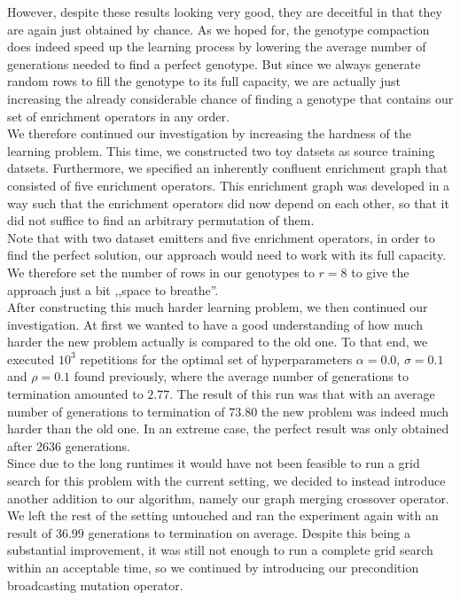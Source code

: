 However, despite these results looking very good, they are deceitful in that they are again just obtained by chance.
As we hoped for, the genotype compaction does indeed speed up the learning process by lowering the average number of generations needed to find a perfect genotype.
But since we always generate random rows to fill the genotype to its full capacity, we are actually just increasing the already considerable chance of finding a genotype that contains our set of enrichment operators in any order.\\

We therefore continued our investigation by increasing the hardness of the learning problem.
This time, we constructed two toy datsets as source training datsets.
Furthermore, we specified an inherently confluent enrichment graph that consisted of five enrichment operators.
This enrichment graph was developed in a way such that the enrichment operators did now depend on each other, so that it did not suffice to find an arbitrary permutation of them.\\

Note that with two dataset emitters and five enrichment operators, in order to find the perfect solution, our approach would need to work with its full capacity.
We therefore set the number of rows in our genotypes to $r=8$ to give the approach just a bit ,,space to breathe''.\\

After constructing this much harder learning problem, we then continued our investigation.
At first we wanted to have a good understanding of how much harder the new problem actually is compared to the old one.
To that end, we executed $10^3$ repetitions for the optimal set of hyperparameters $\alpha=0.0$, $\sigma=0.1$ and $\rho=0.1$ found previously, where the average number of generations to termination amounted to $2.77$.
The result of this run was that with an average number of generations to termination of $73.80$ the new problem was indeed much harder than the old one. In an extreme case, the perfect result was only obtained after 2636 generations.\\

Since due to the long runtimes it would have not been feasible to run a grid search for this problem with the current setting, we decided to instead introduce another addition to our algorithm, namely our graph merging crossover operator.\\

We left the rest of the setting untouched and ran the experiment again with an result of $36.99$ generations to termination on average.
Despite this being a substantial improvement, it was still not enough to run a complete grid search within an acceptable time, so we continued by introducing our precondition broadcasting mutation operator.\\

